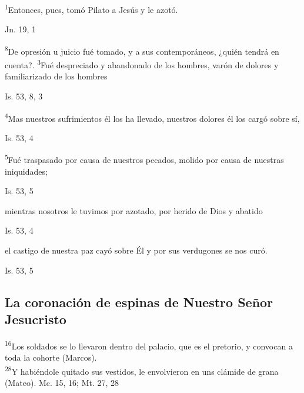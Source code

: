 \documentclass[a4paper,11pt,sans]{article}
\begin{document}
      \textsuperscript{1}Entonces, pues, tomó Pilato a Jesús y le azotó.
      \begin{center}
        Jn. 19, 1
      \end{center}

      \textsuperscript{8}De opresión u juicio fué tomado, y a sus contemporáneos, ¿quién tendrá en cuenta?. \textsuperscript{3}Fué despreciado y abandonado de los hombres,
      varón de dolores y familiarizado de los hombres
      \begin{center}
        Is. 53, 8, 3
      \end{center}

      \textsuperscript{4}Mas nuestros sufrimientos él los ha llevado, nuestros dolores él los cargó sobre sí,
      \begin{center}
        Is. 53, 4
      \end{center}

      \textsuperscript{5}Fué traspasado por causa de nuestros pecados, molido por causa de nuestras iniquidades; 
      \begin{center}
        Is. 53, 5
      \end{center}

      mientras nosotros le tuvimos por azotado, por herido de Dios y abatido
      \begin{center}
        Is. 53, 4 
      \end{center}

      el castigo de nuestra paz cayó sobre Él y por sus verdugones se nos curó.
      \begin{center}
        Is. 53, 5
      \end{center}
      
    \subsection*{\hfil La coronación de espinas de Nuestro Señor Jesucristo \hfil}
      
      \begin{center}
        \textsuperscript{16}Los soldados se lo llevaron dentro del palacio, que es el pretorio, y convocan a toda la cohorte (Marcos).\\
        \textsuperscript{28}Y habiéndole quitado sus vestidos, le envolvieron en uns clámide de grana (Mateo).
        Mc. 15, 16; Mt. 27, 28
      \end{center}
\end{document}
